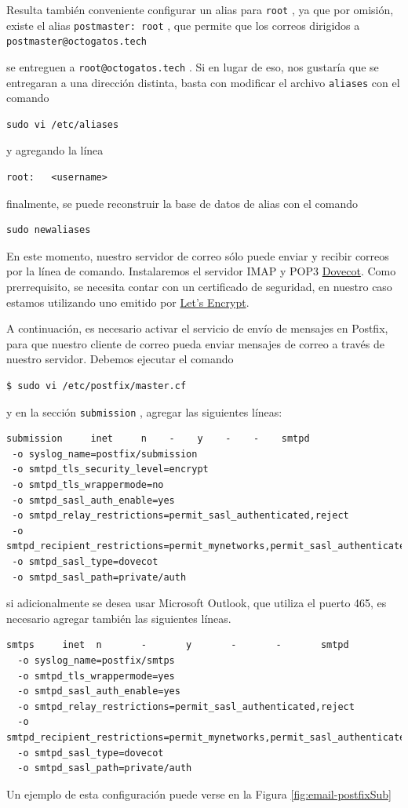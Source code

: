 \documentclass{article}
\newcommand{\ttt}[1]{%
\texttt{#1}%
}
\begin{document}
Resulta tambi\'en conveniente configurar un alias
para \ttt{root}, ya que por omisi\'on, existe el
alias \ttt{postmaster: root}, que permite que los
correos dirigidos a \ttt{postmaster@octogatos.tech}
se entreguen a \ttt{root@octogatos.tech}. Si en
lugar de eso, nos gustar\'ia que se entregaran a una
direcci\'on distinta, basta con modificar el archivo
\ttt{aliases} con el comando
\begin{lstlisting}
sudo vi /etc/aliases
\end{lstlisting}
y agregando la l\'inea
\begin{lstlisting}
root:   <username>
\end{lstlisting}
finalmente, se puede reconstruir la base de datos
de alias con el comando
\begin{lstlisting}
sudo newaliases
\end{lstlisting}

En este momento, nuestro servidor de correo s\'olo
puede enviar y recibir correos por la l\'inea de
comando.   Instalaremos el servidor IMAP y POP3
\href{https://www.dovecot.org/}{Dovecot}.   Como
prerrequisito, se necesita contar con un certificado
de seguridad, en nuestro caso estamos utilizando uno
emitido por \href{https://letsencrypt.org/}{Let's
Encrypt}.

A continuaci\'on, es necesario activar el servicio
de env\'io de mensajes en Postfix, para que nuestro
cliente de correo pueda enviar mensajes de correo
a trav\'es de nuestro servidor. Debemos ejecutar
el comando
\begin{lstlisting}
$ sudo vi /etc/postfix/master.cf
\end{lstlisting}
y en la secci\'on \ttt{submission}, agregar las
siguientes l\'ineas:
\begin{lstlisting}
submission     inet     n    -    y    -    -    smtpd
 -o syslog_name=postfix/submission
 -o smtpd_tls_security_level=encrypt
 -o smtpd_tls_wrappermode=no
 -o smtpd_sasl_auth_enable=yes
 -o smtpd_relay_restrictions=permit_sasl_authenticated,reject
 -o smtpd_recipient_restrictions=permit_mynetworks,permit_sasl_authenticated,reject
 -o smtpd_sasl_type=dovecot
 -o smtpd_sasl_path=private/auth
\end{lstlisting}
si adicionalmente se desea usar Microsoft Outlook,
que utiliza el puerto 465, es necesario agregar
tambi\'en las siguientes l\'ineas.
\begin{lstlisting}
smtps     inet  n       -       y       -       -       smtpd
  -o syslog_name=postfix/smtps
  -o smtpd_tls_wrappermode=yes
  -o smtpd_sasl_auth_enable=yes
  -o smtpd_relay_restrictions=permit_sasl_authenticated,reject
  -o smtpd_recipient_restrictions=permit_mynetworks,permit_sasl_authenticated,reject
  -o smtpd_sasl_type=dovecot
  -o smtpd_sasl_path=private/auth
\end{lstlisting}
Un ejemplo de esta configuraci\'on puede verse en
la Figura \ref{fig:email-postfixSub}
\end{document}
